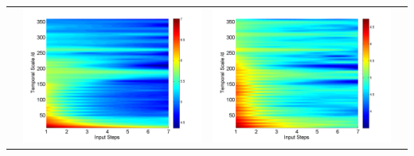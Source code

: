 \documentclass[review]{elsarticle}
\begin{document}
\begin{table}[H]
\begin{tabular}{cccc}
&\begin{minipage}{.3\textwidth}\includegraphics[width=\linewidth]{resultgraph/11532500p_rela.png}\end{minipage}
&\begin{minipage}{.3\textwidth}\includegraphics[width=\linewidth]{resultgraph/11532500pep_rela.png}\end{minipage}

\end{tabular}
\end{table}
\end{document}
